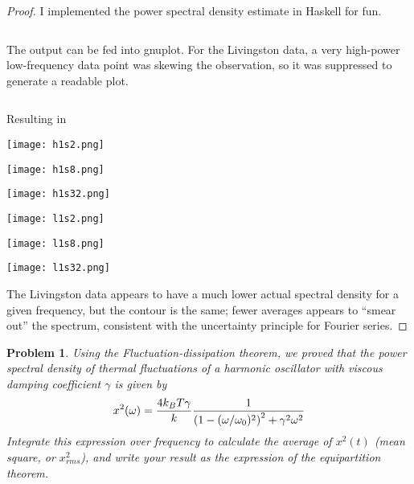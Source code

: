 \documentclass{article}
\newtheorem{plm}{Problem}
\begin{document}
\begin{proof}
  I implemented the power spectral density estimate in Haskell for fun.
  \inputminted[mathescape]{haskell}{GW150914.hs}
  \newpage
  The output can be fed into gnuplot.
  For the Livingston data, a very high-power low-frequency data point was skewing the observation, so it was suppressed to generate a readable plot.
  \inputminted{gnuplot}{p2.plt}
  Resulting in
  \begin{center}
    \texttt{[image: h1s2.png]}
  \end{center}
  \begin{center}
    \texttt{[image: h1s8.png]}
  \end{center}
  \begin{center}
    \texttt{[image: h1s32.png]}
  \end{center}
  \begin{center}
    \texttt{[image: l1s2.png]}
  \end{center}
  \begin{center}
    \texttt{[image: l1s8.png]}
  \end{center}
  \begin{center}
    \texttt{[image: l1s32.png]}
  \end{center}
  The Livingston data appears to have a much lower actual spectral density for a given frequency, but the contour is the same;
  fewer averages appears to ``smear out'' the spectrum, consistent with the uncertainty principle for Fourier series.
\end{proof}

\begin{plm}
  Using the Fluctuation-dissipation theorem, we proved that the power spectral density of
  thermal fluctuations of a harmonic oscillator with viscous damping coefficient $\gamma$ is given by
  \[
    x^{2}(\omega) = \frac{4k_{B}T\gamma}{k}\frac{1}{\qty(1 - (\omega / \omega_{0})^{2})^{2} + \gamma^{2}\omega^{2}}
  \]
  Integrate this expression over frequency to calculate the average of $x^{2}(t)$ (mean square, or $x^{2}_{rms}$),
  and write your result as the expression of the equipartition theorem.
\end{plm}
\end{document}
